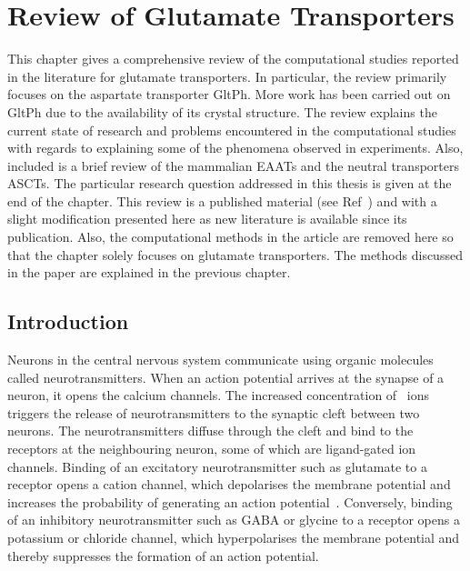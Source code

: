 \chapter{Review of Glutamate Transporters}
\label{chap:gltph}
This chapter gives a comprehensive review of the computational studies reported 
in the literature for glutamate transporters. In particular, the review primarily 
focuses on the aspartate transporter GltPh. More work has been carried out on 
GltPh due to the availability of its crystal structure. The review explains the 
current state of research and problems encountered in the computational studies 
with regards to explaining some of the phenomena observed in experiments. Also, 
included is a brief review of the mammalian EAATs and the neutral transporters 
ASCTs. The particular research question addressed in this thesis is given at the 
end of the chapter. This review is a published material (see Ref~\cite{Setiadi2015}) 
and with a slight modification presented here as new literature is available since 
its publication. Also, the computational methods in the article are removed here 
so that the chapter solely focuses on glutamate transporters. The methods discussed 
in the paper are explained in the previous chapter.

\newpage
\section{Introduction}
Neurons in the central nervous system communicate using organic molecules called 
neurotransmitters. When an action potential arrives at the synapse of a neuron, 
it opens the calcium channels. The increased concentration of \Ca\ ions triggers 
the release of neurotransmitters to the synaptic cleft between two neurons. The 
neurotransmitters diffuse through the cleft and bind to the receptors at the 
neighbouring neuron, some of which are ligand-gated ion channels. Binding of an 
excitatory neurotransmitter such as glutamate to a receptor opens a cation 
channel, which  depolarises the membrane potential and increases the probability 
of generating an action potential~\cite{Lisman2007}. Conversely, binding of an 
inhibitory neurotransmitter such as GABA or glycine to a receptor opens a 
potassium or chloride channel, which hyperpolarises the membrane potential and 
thereby suppresses the formation of an action potential.

